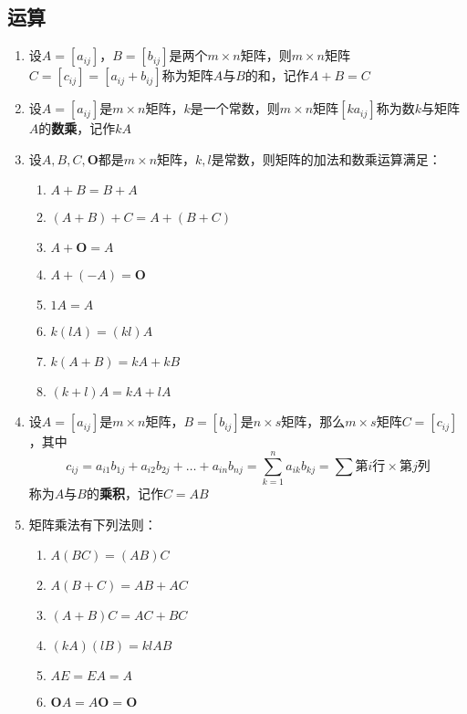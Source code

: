 \documentclass[a4paper,12pt]{article}
\begin{document}
    \subsection{运算}

    \begin{enumerate}
        \item 设$A = [a_{ij}]$，$B = [b_{ij}]$是两个$m \times n$矩阵，则$m \times n$矩阵$C = [c_{ij}] = [a_{ij} + b_{ij}]$称为矩阵$A$与$B$的和，记作$A + B = C$
        \item 设$A = [a_{ij}]$是$m \times n$矩阵，$k$是一个常数，则$m \times n$矩阵$[ka_{ij}]$称为数$k$与矩阵$A$的\textbf{数乘}，记作$kA$
        \item 设$A, B, C, \mathbf{O}$都是$m \times n$矩阵，$k, l$是常数，则矩阵的加法和数乘运算满足：
        \begin{enumerate}
            \item $A + B = B + A$
            \item $(A + B) + C = A + (B + C)$
            \item $A + \mathbf{O} = A$
            \item $A + (-A) = \mathbf{O}$
            \item $1A = A$
            \item $k(lA) = (kl)A$
            \item $k(A + B) = kA + kB$
            \item $(k + l)A = kA + lA$
        \end{enumerate}
        \item 设$A = [a_{ij}]$是$m \times n$矩阵，$B = [b_{ij}]$是$n \times s$矩阵，那么$m \times s$矩阵$C = [c_{ij}]$，其中
        \[
            c_{ij} = a_{i1}b_{1j} + a_{i2}b_{2j} + \dots + a_{in}b_{nj} = \sum_{k=1}^{n} a_{ik}b_{kj} = \sum \text{第$i$行} \times \text{第$j$列}
        \]
        称为$A$与$B$的\textbf{乘积}，记作$C = AB$
        \item 矩阵乘法有下列法则：
        \begin{enumerate}
            \item $A(BC) = (AB)C$
            \item $A(B + C) = AB + AC$
            \item $(A + B)C = AC + BC$
            \item $(kA)(lB) = klAB$
            \item $AE = EA = A$
            \item $\mathbf{O}A = A\mathbf{O} = \mathbf{O}$
        \end{enumerate}

\end{enumerate}
\end{document}
